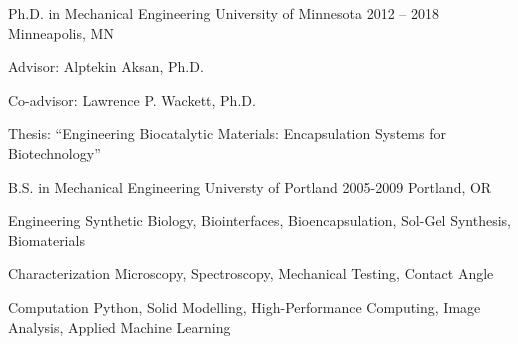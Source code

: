 \documentclass[11pt, letterpaper]{awesome-cv} %
\begin{document}
\begin{sloppypar}
	
\makecvheader %



%
\begin{cventries}
	
	
	\cventry
	{Ph.D. in Mechanical Engineering} %
	{University of Minnesota} %
	{2012 – 2018} %
	{Minneapolis, MN} %
	{ %
		\begin{cvitems}
			\item {Advisor: Alptekin Aksan, Ph.D.}
			\item{Co-advisor: Lawrence P. Wackett, Ph.D.}
			\item{Thesis: “Engineering Biocatalytic Materials: Encapsulation Systems for Biotechnology”
			}
		\end{cvitems}
	}
	
	\cventry
	{B.S. in Mechanical Engineering}
	{Universty of Portland}
	{2005-2009}
	{Portland, OR}
	{	}
\end{cventries}

%
\begin{cvskills}
	
	\cvskill
	{Engineering \faWrench}
	{Synthetic Biology, Biointerfaces, Bioencapsulation, Sol-Gel Synthesis, Biomaterials}
	
	\cvskill
	{Characterization \faMicroscope } %
	{Microscopy, Spectroscopy, Mechanical Testing, Contact Angle} %
	
	\cvskill
	{Computation \faMicrochip} %
	{Python, Solid Modelling, High-Performance Computing, Image Analysis, Applied Machine Learning} %
	

\end{cvskills}
%


\end{sloppypar}
\end{document}
